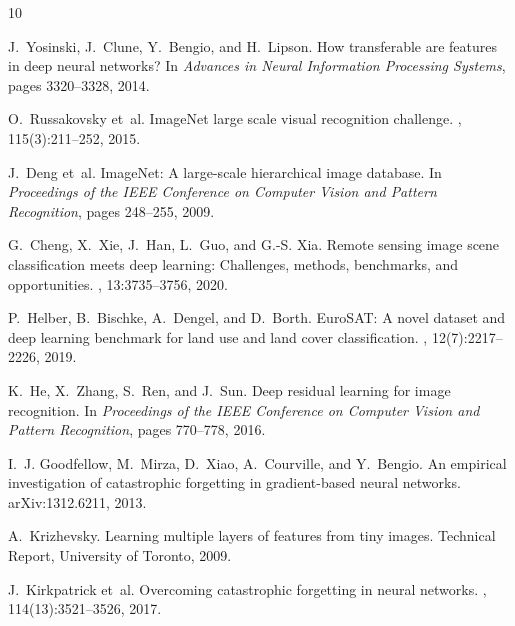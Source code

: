 \documentclass[10pt,twocolumn,letterpaper]{article}
\begin{document}
\vspace{0.1em}
\footnotesize
\begin{thebibliography}{10}
\setlength{\itemsep}{0pt}
\setlength{\parskip}{0pt}

J.~Yosinski, J.~Clune, Y.~Bengio, and H.~Lipson.
\newblock How transferable are features in deep neural networks?
\newblock In {\em Advances in Neural Information Processing Systems}, pages 3320--3328, 2014.

O.~Russakovsky et~al.
\newblock ImageNet large scale visual recognition challenge.
, 115(3):211--252, 2015.

J.~Deng et~al.
\newblock ImageNet: A large-scale hierarchical image database.
\newblock In {\em Proceedings of the IEEE Conference on Computer Vision and Pattern Recognition}, pages 248--255, 2009.

G.~Cheng, X.~Xie, J.~Han, L.~Guo, and G.-S. Xia.
\newblock Remote sensing image scene classification meets deep learning: Challenges, methods, benchmarks, and opportunities.
, 13:3735--3756, 2020.

P.~Helber, B.~Bischke, A.~Dengel, and D.~Borth.
\newblock EuroSAT: A novel dataset and deep learning benchmark for land use and land cover classification.
, 12(7):2217--2226, 2019.

K.~He, X.~Zhang, S.~Ren, and J.~Sun.
\newblock Deep residual learning for image recognition.
\newblock In {\em Proceedings of the IEEE Conference on Computer Vision and Pattern Recognition}, pages 770--778, 2016.

I.~J. Goodfellow, M.~Mirza, D.~Xiao, A.~Courville, and Y.~Bengio.
\newblock An empirical investigation of catastrophic forgetting in gradient-based neural networks.
\newblock arXiv:1312.6211, 2013.

A.~Krizhevsky.
\newblock Learning multiple layers of features from tiny images.
\newblock Technical Report, University of Toronto, 2009.

J.~Kirkpatrick et~al.
\newblock Overcoming catastrophic forgetting in neural networks.
, 114(13):3521--3526, 2017.


\end{thebibliography}
\end{document}
